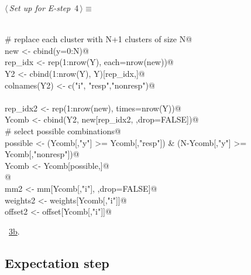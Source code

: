 \documentclass[reqno]{amsart}
\renewcommand{\NWtarget}[2]{\hypertarget{#1}{#2}}
\renewcommand{\NWlink}[2]{\hyperlink{#1}{#2}}
\begin{document}
\begin{flushleft} \small\label{scrap5}\raggedright\small
\NWtarget{nuweb4}{} $\langle\,${\itshape Set up for E-step}\nobreak\ {\footnotesize {4}}$\,\rangle\equiv$
\vspace{-1ex}
\begin{list}{}{} \item
\mbox{}\verb@@\\
\mbox{}\verb@  # replace each cluster with N+1 clusters of size N@\\
\mbox{}\verb@  new <- cbind(y=0:N)@\\
\mbox{}\verb@  rep_idx <- rep(1:nrow(Y), each=nrow(new))@\\
\mbox{}\verb@  Y2 <- cbind(1:nrow(Y), Y)[rep_idx,]@\\
\mbox{}\verb@  colnames(Y2) <- c("i", "resp","nonresp")@\\
\mbox{}\verb@@\\
\mbox{}\verb@  rep_idx2 <- rep(1:nrow(new), times=nrow(Y))@\\
\mbox{}\verb@  Ycomb <- cbind(Y2, new[rep_idx2, ,drop=FALSE])@\\
\mbox{}\verb@  # select possible combinations@\\
\mbox{}\verb@  possible <- (Ycomb[,"y"] >= Ycomb[,"resp"]) & (N-Ycomb[,"y"] >= Ycomb[,"nonresp"])@\\
\mbox{}\verb@  Ycomb <- Ycomb[possible,]@\\
\mbox{}\verb@ @\\
\mbox{}\verb@  mm2 <- mm[Ycomb[,"i"], ,drop=FALSE]@\\
\mbox{}\verb@  weights2 <- weights[Ycomb[,"i"]]@\\
\mbox{}\verb@  offset2 <- offset[Ycomb[,"i"]]@\\
\mbox{}\verb@@{\NWsep}
\end{list}
\vspace{-1.5ex}
\footnotesize
\begin{list}{}{\setlength{\itemsep}{-\parsep}\setlength{\itemindent}{-\leftmargin}}
\item \NWtxtMacroRefIn\ \NWlink{nuweb3b}{3b}.

\item{}
\end{list}
\vspace{4ex}
\end{flushleft}
\subsection{Expectation step}
\end{document}
